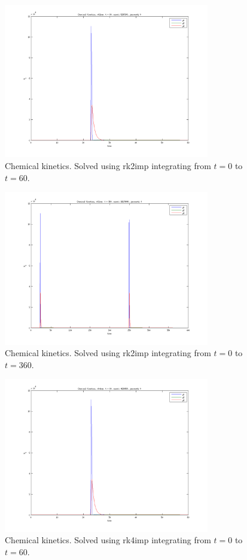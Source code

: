 \begin{figure}[h!]
	\centering
	\includegraphics[width=0.8\textwidth]{img/exc2_2_60}
	\caption{Chemical kinetics. Solved using rk2imp integrating from $t=0$ to $t=60$.}
	\label{fig:exc2_2_60}
\end{figure}

\begin{figure}[h!]
	\centering
	\includegraphics[width=0.8\textwidth]{img/exc2_2_360}
	\caption{Chemical kinetics. Solved using rk2imp integrating from $t=0$ to $t=360$.}
	\label{fig:exc2_2_360}
\end{figure}

\begin{figure}[h!]
	\centering
	\includegraphics[width=0.8\textwidth]{img/exc2_4_60}
	\caption{Chemical kinetics. Solved using rk4imp integrating from $t=0$ to $t=60$.}
	\label{fig:exc2_4_60}
\end{figure}


